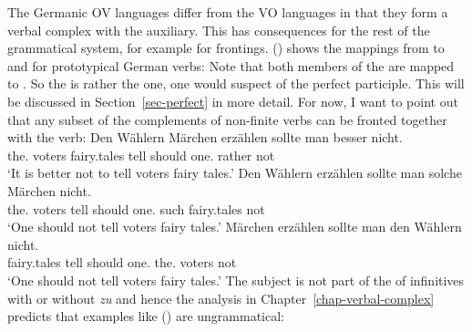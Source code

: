 The Germanic OV languages differ from the VO languages in that they form a verbal complex with the
auxiliary. This has consequences for the rest of the grammatical system, for example for
frontings. () shows the mappings from \argst to \spr and \comps for prototypical German verbs:
\ea
\label{partizipien-hm}%
\z
Note that both members of the \argstl are mapped to \comps. So the \compsv is rather the one, one
would suspect of the perfect participle. This will be discussed in Section~\ref{sec-perfect} in more detail.
For now, I want to point out that any subset of the complements of non-finite verbs can be fronted
together with the verb:
\eal
\ex 
\gll Den        Wählern Märchen erzählen sollte man besser nicht.\\
     the.\DAT{} voters fairy.tales tell should one.\NOM{} rather not\\
\glt `It is better not to tell voters fairy tales.'
\ex 
\gll Den        Wählern erzählen sollte man solche Märchen     nicht.\\
     the.\DAT{} voters  tell     should one.\NOM{} such   fairy.tales not\\
\glt `One should not tell voters fairy tales.'
\ex 
\gll Märchen     erzählen sollte man den        Wählern nicht.\\
     fairy.tales tell     should one.\NOM{} the.\DAT{} voters   not\\
\glt `One should not tell voters fairy tales.'
\zl
The subject is not part of the \compsl of infinitives with or without \emph{zu} and hence the
analysis in Chapter~\ref{chap-verbal-complex} predicts that examples like () are
ungrammatical:
\eal
{}
